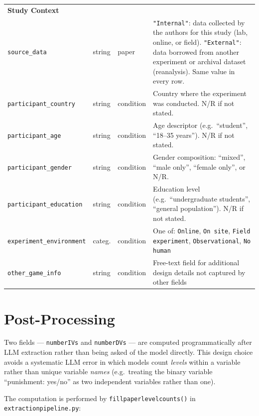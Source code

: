 \documentclass[11pt,a4paper]{article}
\begin{document}
\begin{longtable}{p{3.9cm} p{1.2cm} p{2.1cm} >{\raggedright\arraybackslash}p{6.4cm}}
\multicolumn{4}{l}{\textbf{Study Context}}\\[2pt]
\texttt{source\_data} & string & paper & \texttt{"Internal"}: data collected by the authors for this study (lab, online, or field). \texttt{"External"}: data borrowed from another experiment or archival dataset (reanalysis). Same value in every row. \\
\texttt{participant\_country} & string & condition & Country where the experiment was conducted. N/R if not stated. \\
\texttt{participant\_age} & string & condition & Age descriptor (e.g.\ ``student'', ``18--35 years''). N/R if not stated. \\
\texttt{participant\_gender} & string & condition & Gender composition: ``mixed'', ``male only'', ``female only'', or N/R. \\
\texttt{participant\_education} & string & condition & Education level (e.g.\ ``undergraduate students'', ``general population''). N/R if not stated. \\
\texttt{experiment\_environment} & categ. & condition & One of: \texttt{Online}, \texttt{On site}, \texttt{Field experiment}, \texttt{Observational}, \texttt{No human} \\
\texttt{other\_game\_info} & string & condition & Free-text field for additional design details not captured by other fields \\

\end{longtable}
\renewcommand{\_}{\textunderscore}
\renewcommand{\arraystretch}{1.0}

\section{Post-Processing}
\label{sec:postprocessing}

Two fields — \texttt{number\_IVs} and \texttt{number\_DVs} — are computed programmatically after LLM extraction rather than being asked of the model directly. This design choice avoids a systematic LLM error in which models count \emph{levels} within a variable rather than unique variable \emph{names} (e.g.\ treating the binary variable ``punishment: yes/no'' as two independent variables rather than one).

The computation is performed by \texttt{fill\_paper\_level\_counts()} in \texttt{extraction\_pipeline.py}:
\end{document}
